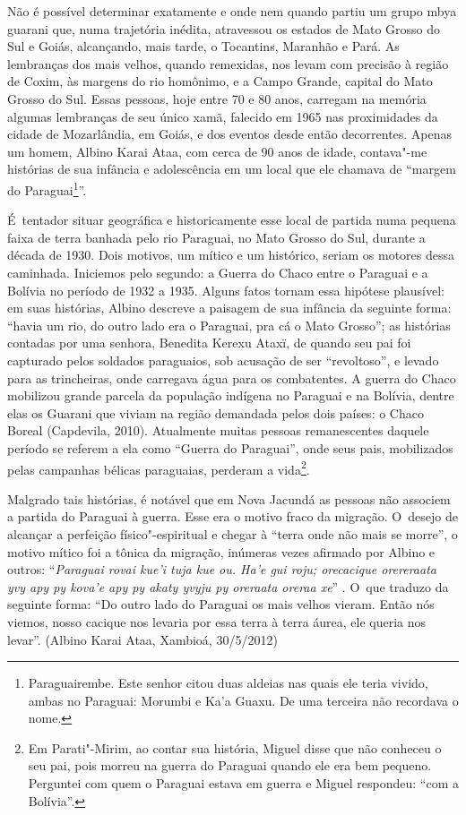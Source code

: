 Não é possível determinar exatamente e onde nem quando partiu um grupo
mbya guarani que, numa trajetória inédita, atravessou os estados de
Mato Grosso do Sul e Goiás, alcançando, mais tarde, o Tocantins,
Maranhão e Pará. As lembranças dos mais velhos, quando remexidas, nos
levam com precisão à região de Coxim, às margens do rio homônimo, e a
Campo Grande, capital do Mato Grosso do Sul. Essas pessoas, hoje entre
70 e 80 anos, carregam na memória algumas lembranças de seu único xamã,
falecido em 1965 nas proximidades da cidade de Mozarlândia, em Goiás, e
dos eventos desde então decorrentes. Apenas um homem, Albino Karai
Ataa, com cerca de 90 anos de idade, contava"-me histórias de sua
infância e adolescência em um local que ele chamava de ``margem do
Paraguai\footnote{Paraguairembe. Este senhor citou duas aldeias nas
quais ele teria vivido, ambas no Paraguai: Morumbi e Ka’a Guaxu. De uma
terceira não recordava o nome.}''. 

É~tentador situar geográfica e historicamente esse local de partida numa
pequena faixa de terra banhada pelo rio Paraguai, no Mato Grosso do
Sul, durante a década de 1930. Dois motivos, um mítico e um histórico,
seriam os motores dessa caminhada. Iniciemos pelo segundo: a Guerra do
Chaco entre o Paraguai e a Bolívia no período de 1932 a 1935. Alguns
fatos tornam essa hipótese plausível: em suas histórias, Albino
descreve a paisagem de sua infância da seguinte forma: ``havia um rio,
do outro lado era o Paraguai, pra cá o Mato Grosso''; as histórias
contadas por uma senhora, Benedita Kerexu Ataxï, de quando seu pai foi
capturado pelos soldados paraguaios, sob acusação de ser ``revoltoso'', e
levado para as trincheiras, onde carregava água para os combatentes. A
guerra do Chaco mobilizou grande parcela da população indígena no
Paraguai e na Bolívia, dentre elas os Guarani que viviam na região
demandada pelos dois países: o Chaco Boreal (Capdevila, 2010).
Atualmente muitas pessoas remanescentes daquele período se referem a
ela como ``Guerra do Paraguai'', onde seus pais, mobilizados pelas
campanhas bélicas paraguaias, perderam a vida\footnote{Em Parati"-Mirim,
ao contar sua história, Miguel disse que não conheceu o seu pai, pois
morreu na guerra do Paraguai quando ele era bem pequeno. Perguntei com
quem o Paraguai estava em guerra e Miguel respondeu: ``com a Bolívia''.}.

Malgrado tais histórias, é notável que em Nova Jacundá as pessoas não
associem a partida do Paraguai à guerra. Esse era o motivo fraco da
migração. O~desejo de alcançar a perfeição físico"-espiritual e chegar à
``terra onde não mais se morre'', o motivo mítico foi a tônica da
migração, inúmeras vezes afirmado por Albino e outros: ``\emph{Paraguai rovai
kue’i tuja kue ou. Ha’e gui roju; orecacique orereraata yvy apy py
kova’e apy py akaty yvyju py oreraata oreraa xe}'' . O~que traduzo da
seguinte forma: ``Do outro lado do Paraguai os mais velhos vieram. Então
nós viemos, nosso cacique nos levaria por essa terra à terra áurea, ele
queria nos levar''. (Albino Karai Ataa,  Xambioá, 30/5/2012)

